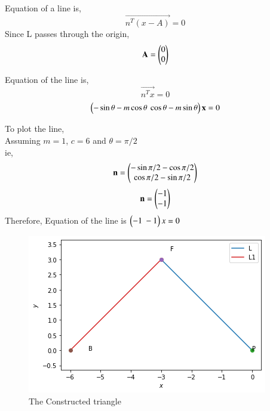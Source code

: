 \documentclass[journal,12pt,twocolumn]{IEEEtran}
\begin{document}
Equation of a line is,
\begin{equation}
    \vec{n^T(x-A)}=0
\end{equation}
Since L passes through the origin,
\begin{equation}
\mathbf{A}=\begin{pmatrix}0 \\ 0\end{pmatrix}
\end{equation}

Equation of the line is, 
\begin{equation}
    \vec{n^Tx}=0
\end{equation}
\begin{equation}     
  \vec{ \myvec{ -\sin\theta - m\cos\theta \ \cos\theta - m\sin\theta}x} = 0
 \end{equation} 

To plot the line,\\

Assuming $m=1$, $c=6$ and $\theta =\pi/2$\\ 

ie,
\begin{equation}
\mathbf{n =  \begin{pmatrix} -\sin\pi/2 - \cos\pi/2 \\ \cos\pi/2 - \sin\pi/2\end{pmatrix}}
\end{equation}
\begin{equation}
\mathbf{n =  \begin{pmatrix}-1\\ -1\end{pmatrix}}
\end{equation}
Therefore, Equation of the line is $\myvec{-1\ -1}x=0$
 

\begin{figure}[!h]
         \centering
         \includegraphics[width= \columnwidth]{index.png}
         \caption{The Constructed triangle}
         \label{Figure}
\end{figure}
\end{document}
